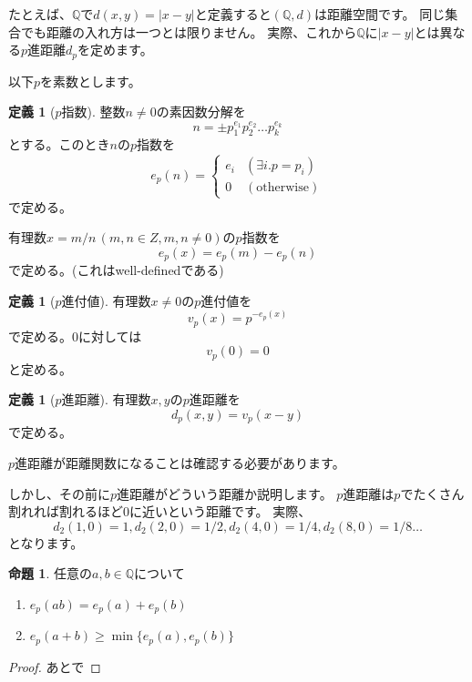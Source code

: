 \documentclass[uplatex]{jsarticle}
\newcommand{\Q}{\mathbb{Q}}
\theoremstyle{definition} %
\newtheorem{defi}[thm]{定義}
\newtheorem{prop}[thm]{命題}
\begin{document}
たとえば、$\Q$で$d(x, y) = |x - y|$と定義すると$(\Q, d)$は距離空間です。
同じ集合でも距離の入れ方は一つとは限りません。
実際、これから$\Q$に$|x - y|$とは異なる$p$進距離$d_p$を定めます。

以下$p$を素数とします。

\begin{oframed}\begin{defi}[$p$指数]
整数$n \ne 0$の素因数分解を
\[n = \pm p_1^{e_1} p_2^{e_2} \dots p_k^{e_k}\]
とする。このとき$n$の$p$指数を
\[e_p(n) = \begin{cases}e_i & (\exists i. p = p_i) \\ 0 & (\text{otherwise}) \end{cases} \]
で定める。

有理数$x = m/n\,(m,n \in Z, m, n \ne 0)$の$p$指数を
\[e_p(x) = e_p(m) - e_p(n)\]
で定める。(これはwell-definedである)
\end{defi}\end{oframed}

\begin{oframed}\begin{defi}[$p$進付値]
有理数$x \ne 0$の$p$進付値を
\[v_p(x) = p^{-e_p(x)}\]
で定める。$0$に対しては
\[v_p(0) = 0\]
と定める。
\end{defi}\end{oframed}

\begin{oframed}\begin{defi}[$p$進距離]
有理数$x, y$の$p$進距離を
\[d_p(x, y) = v_p(x - y)\]
で定める。
\end{defi}\end{oframed}

$p$進距離が距離関数になることは確認する必要があります。

しかし、その前に$p$進距離がどういう距離か説明します。
$p$進距離は$p$でたくさん割れれば割れるほど$0$に近いという距離です。
実際、
\[d_2(1, 0) = 1, d_2(2, 0) = 1/2, d_2(4, 0) = 1/4, d_2(8, 0) = 1/8 \dots\]
となります。

\begin{oframed}\begin{prop}\label{prop:1}
任意の$a, b \in \Q$について
\begin{enumerate}
\item $e_p(ab) = e_p(a) + e_p(b)$
\item $e_p(a+b) \geq \min\{e_p(a), e_p(b)\}$
\end{enumerate}
\end{prop}\end{oframed}
\begin{proof}
あとで
\end{proof}
\end{document}
